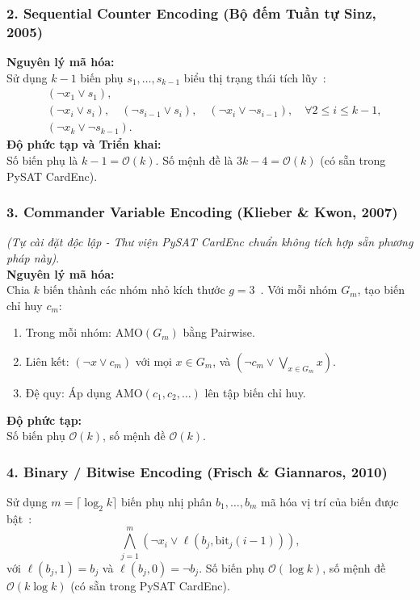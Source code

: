 \documentclass[11pt,a4paper]{article}
\begin{document}
\subsubsection{2. Sequential Counter Encoding (Bộ đếm Tuần tự Sinz, 2005)}
\textbf{Nguyên lý mã hóa:}\\
Sử dụng $k-1$ biến phụ $s_1, \dots, s_{k-1}$ biểu thị trạng thái tích lũy~\cite{sinz2005towards}:
\begin{align}
    &(\neg x_1 \lor s_1), \\
    &(\neg x_i \lor s_i), \quad (\neg s_{i-1} \lor s_i), \quad (\neg x_i \lor \neg s_{i-1}), \quad \forall 2 \le i \le k-1, \\
    &(\neg x_k \lor \neg s_{k-1}).
\end{align}
\textbf{Độ phức tạp và Triển khai:}\\
Số biến phụ là $k - 1 = \mathcal{O}(k)$. Số mệnh đề là $3k - 4 = \mathcal{O}(k)$ (có sẵn trong PySAT CardEnc).

\subsubsection{3. Commander Variable Encoding (Klieber \& Kwon, 2007)}
\textit{(Tự cài đặt độc lập - Thư viện PySAT CardEnc chuẩn không tích hợp sẵn phương pháp này)}.\\
\textbf{Nguyên lý mã hóa:}\\
Chia $k$ biến thành các nhóm nhỏ kích thước $g=3$~\cite{klieber2007efficient}. Với mỗi nhóm $G_m$, tạo biến chỉ huy $c_m$:
\begin{enumerate}
    \item Trong mỗi nhóm: $\text{AMO}(G_m)$ bằng Pairwise.
    \item Liên kết: $(\neg x \lor c_m)$ với mọi $x \in G_m$, và $(\neg c_m \lor \bigvee_{x \in G_m} x)$.
    \item Đệ quy: Áp dụng $\text{AMO}(c_1, c_2, \dots)$ lên tập biến chỉ huy.
\end{enumerate}
\textbf{Độ phức tạp:}\\
Số biến phụ $\mathcal{O}(k)$, số mệnh đề $\mathcal{O}(k)$.

\subsubsection{4. Binary / Bitwise Encoding (Frisch \& Giannaros, 2010)}
Sử dụng $m = \lceil \log_2 k \rceil$ biến phụ nhị phân $b_1, \dots, b_m$ mã hóa vị trí của biến được bật~\cite{frisch2010sat,prestwich2009cnf}:
\begin{equation}
    \bigwedge_{j=1}^m (\neg x_i \lor \ell(b_j, \text{bit}_j(i-1))),
\end{equation}
với $\ell(b_j, 1) = b_j$ và $\ell(b_j, 0) = \neg b_j$. Số biến phụ $\mathcal{O}(\log k)$, số mệnh đề $\mathcal{O}(k \log k)$ (có sẵn trong PySAT CardEnc).
\end{document}
